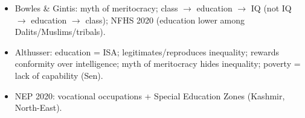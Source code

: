 \begin{QuickRevision}
\begin{itemize}
\item Bowles \& Gintis: myth of meritocracy; class $\rightarrow$ education $\rightarrow$ IQ (not IQ $\rightarrow$ education $\rightarrow$ class); NFHS 2020 (education lower among Dalits/Muslims/tribals).
\item Althusser: education = ISA; legitimates/reproduces inequality; rewards conformity over intelligence; myth of meritocracy hides inequality; poverty = lack of capability (Sen).
\item NEP 2020: vocational occupations + Special Education Zones (Kashmir, North-East).
\end{itemize}
\end{QuickRevision}

